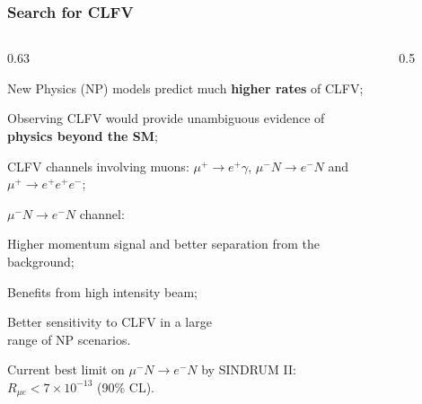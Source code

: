 \documentclass{beamer}
\begin{document}
\begin{frame}
    \frametitle{Search for CLFV}
                \vspace{-2mm}
   \begin{columns}
    \begin{column}{0.63\framewidth}
        \setlength{\leftmargini}{1.3em}
        \begin{itemize}
            {\footnotesize    \item New Physics (NP) models predict much \textbf{higher rates} of CLFV;
            \vspace{2mm}
            \item Observing CLFV would provide unambiguous evidence of 
            \\ \textbf{physics beyond the SM};
            \vspace{2mm}
            \item CLFV channels involving muons: $\mu^+ \rightarrow e^+ \gamma$, $\mu^- N \rightarrow e^- N$ and $\mu^+ \rightarrow e^+ e^+ e^-$;
            \vspace{2mm}
            \item $\mu^- N \rightarrow e^- N$ channel:}
            \vspace{1mm}
            \begin{itemize}
                {\footnotesize    \item Higher momentum signal and better separation from the background;
                \vspace{1mm}
                \item Benefits from high intensity beam;
                \vspace{1mm}
                \item Better sensitivity to CLFV in a large \\ range of NP scenarios.}
            \end{itemize}
            \vspace{2mm}
            {\footnotesize    \item Current best limit on $\mu^- N \rightarrow e^- N$ by SINDRUM II: $R_{\mu e} < 7 \times 10^{-13}$ (90\% CL).}
        \end{itemize}
    \end{column}
    \begin{column}{0.5\framewidth}
        \begin{figure}[h]

\end{figure}
\end{column}
\end{columns}
\end{frame}
\end{document}
